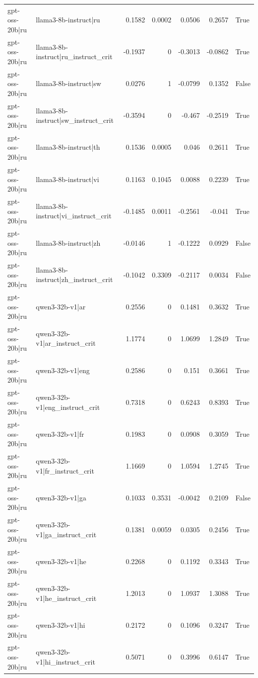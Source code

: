 \begin{table}
\begin{tabular}{l l r r r r l}
gpt-oss-20b|ru & llama3-8b-instruct|ru & 0.1582 & 0.0002 & 0.0506 & 0.2657 & True \\
gpt-oss-20b|ru & llama3-8b-instruct|ru_instruct_crit & -0.1937 & 0 & -0.3013 & -0.0862 & True \\
gpt-oss-20b|ru & llama3-8b-instruct|sw & 0.0276 & 1 & -0.0799 & 0.1352 & False \\
gpt-oss-20b|ru & llama3-8b-instruct|sw_instruct_crit & -0.3594 & 0 & -0.467 & -0.2519 & True \\
gpt-oss-20b|ru & llama3-8b-instruct|th & 0.1536 & 0.0005 & 0.046 & 0.2611 & True \\
gpt-oss-20b|ru & llama3-8b-instruct|vi & 0.1163 & 0.1045 & 0.0088 & 0.2239 & True \\
gpt-oss-20b|ru & llama3-8b-instruct|vi_instruct_crit & -0.1485 & 0.0011 & -0.2561 & -0.041 & True \\
gpt-oss-20b|ru & llama3-8b-instruct|zh & -0.0146 & 1 & -0.1222 & 0.0929 & False \\
gpt-oss-20b|ru & llama3-8b-instruct|zh_instruct_crit & -0.1042 & 0.3309 & -0.2117 & 0.0034 & False \\
gpt-oss-20b|ru & qwen3-32b-v1|ar & 0.2556 & 0 & 0.1481 & 0.3632 & True \\
gpt-oss-20b|ru & qwen3-32b-v1|ar_instruct_crit & 1.1774 & 0 & 1.0699 & 1.2849 & True \\
gpt-oss-20b|ru & qwen3-32b-v1|eng & 0.2586 & 0 & 0.151 & 0.3661 & True \\
gpt-oss-20b|ru & qwen3-32b-v1|eng_instruct_crit & 0.7318 & 0 & 0.6243 & 0.8393 & True \\
gpt-oss-20b|ru & qwen3-32b-v1|fr & 0.1983 & 0 & 0.0908 & 0.3059 & True \\
gpt-oss-20b|ru & qwen3-32b-v1|fr_instruct_crit & 1.1669 & 0 & 1.0594 & 1.2745 & True \\
gpt-oss-20b|ru & qwen3-32b-v1|ga & 0.1033 & 0.3531 & -0.0042 & 0.2109 & False \\
gpt-oss-20b|ru & qwen3-32b-v1|ga_instruct_crit & 0.1381 & 0.0059 & 0.0305 & 0.2456 & True \\
gpt-oss-20b|ru & qwen3-32b-v1|he & 0.2268 & 0 & 0.1192 & 0.3343 & True \\
gpt-oss-20b|ru & qwen3-32b-v1|he_instruct_crit & 1.2013 & 0 & 1.0937 & 1.3088 & True \\
gpt-oss-20b|ru & qwen3-32b-v1|hi & 0.2172 & 0 & 0.1096 & 0.3247 & True \\
gpt-oss-20b|ru & qwen3-32b-v1|hi_instruct_crit & 0.5071 & 0 & 0.3996 & 0.6147 & True \\

\end{tabular}
\end{table}

